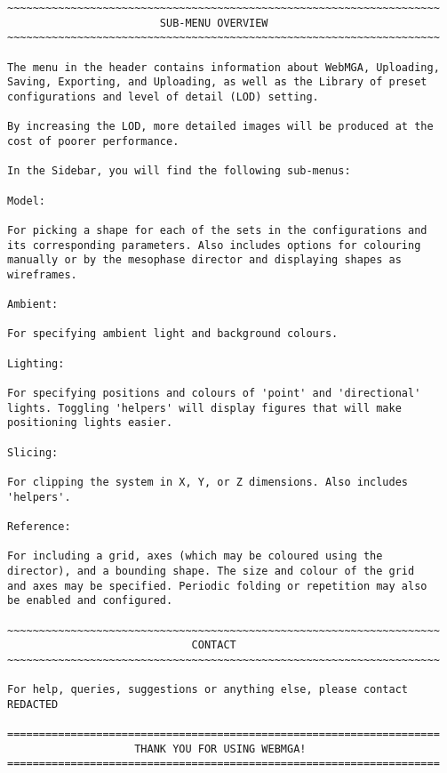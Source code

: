 \begin{verbatim}
~~~~~~~~~~~~~~~~~~~~~~~~~~~~~~~~~~~~~~~~~~~~~~~~~~~~~~~~~~~~~~~~~~~~
                        SUB-MENU OVERVIEW
~~~~~~~~~~~~~~~~~~~~~~~~~~~~~~~~~~~~~~~~~~~~~~~~~~~~~~~~~~~~~~~~~~~~

The menu in the header contains information about WebMGA, Uploading,
Saving, Exporting, and Uploading, as well as the Library of preset
configurations and level of detail (LOD) setting.

By increasing the LOD, more detailed images will be produced at the
cost of poorer performance.

In the Sidebar, you will find the following sub-menus:

Model:

For picking a shape for each of the sets in the configurations and
its corresponding parameters. Also includes options for colouring
manually or by the mesophase director and displaying shapes as
wireframes.

Ambient:

For specifying ambient light and background colours.

Lighting:

For specifying positions and colours of 'point' and 'directional'
lights. Toggling 'helpers' will display figures that will make
positioning lights easier.

Slicing:

For clipping the system in X, Y, or Z dimensions. Also includes
'helpers'.

Reference:

For including a grid, axes (which may be coloured using the
director), and a bounding shape. The size and colour of the grid
and axes may be specified. Periodic folding or repetition may also
be enabled and configured.

~~~~~~~~~~~~~~~~~~~~~~~~~~~~~~~~~~~~~~~~~~~~~~~~~~~~~~~~~~~~~~~~~~~~
                             CONTACT
~~~~~~~~~~~~~~~~~~~~~~~~~~~~~~~~~~~~~~~~~~~~~~~~~~~~~~~~~~~~~~~~~~~~

For help, queries, suggestions or anything else, please contact
REDACTED

====================================================================
                    THANK YOU FOR USING WEBMGA!
====================================================================
\end{verbatim}

